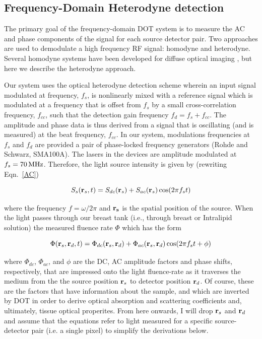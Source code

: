 \subsection{Frequency-Domain Heterodyne detection}
\label{sec:heterodyne}
The primary goal of the frequency-domain DOT system is to measure the AC and phase components of the signal for each source detector pair. Two approaches are used to demodulate a high frequency RF signal: homodyne and heterodyne. Several homodyne systems have been developed for diffuse optical imaging \cite{Troy1996,Sevick-Muraca1997,Godavarty2003}, but here we describe the heterodyne approach.

Our system uses the optical heterodyne detection scheme wherein an input signal modulated at frequency, $f_{s}$, is nonlinearly mixed with a reference signal which is modulated at a frequency that is offset from $f_{s}$ by a small cross-correlation frequency, $f_{cc}$, such that the detection gain frequency $f_{d}=f_{s}+f_{cc}$. The amplitude and phase data is thus derived from a signal that is oscillating (and is measured) at the beat frequency, $f_{cc}$. In our system, modulations frequencies at $f_{s}$ and  $f_{d}$ are provided a pair of phase-locked frequency generators (Rohde and Schwarz, SMA100A). The lasers in the devices are amplitude modulated at $f_{s}=70\,{\rm MHz}$. Therefore, the light source intensity is given by (rewriting Eqn.~\ref{AC})

\begin{equation}
S_s({\bf r}_s,t) = S_{dc}({\bf r}_s) + S_{ac}({\bf r}_s)\cos(2\pi f_s t)
\end{equation}

where the frequency $f=\omega/2\pi$ and ${\bf r_s}$ is the spatial position of the source. When the light passes through our breast tank (i.e., through breast or Intralipid solution) the measured fluence rate $\Phi$ which has the form

\begin{equation}
\label{eqn:FDfluence}
\Phi({\bf r}_s,{\bf r}_d,t) = \Phi_{dc}({\bf r}_s,{\bf r}_d) + \Phi_{ac}({\bf r}_s,{\bf r}_d)\cos(2\pi f_s t + \phi)
\end{equation}

where $\Phi_{dc}$, $\Phi_{ac}$, and $\phi$ are the DC, AC amplitude factors and phase shifts, respectively, that are impressed onto the light fluence-rate as it traverses the medium from the the source position ${\bf r}_s$ to detector position ${\bf r}_d$. Of course, these are the factors that have information about the sample, and which are inverted by DOT in order to derive optical absorption and scattering coefficients and, ultimately, tissue optical properites. From here onwards, I will drop ${\bf r}_s$ and ${\bf r}_d$ and assume that the equations refer to light measured for a specific source-detector pair (i.e. a single pixel) to simplify the derivations below.


